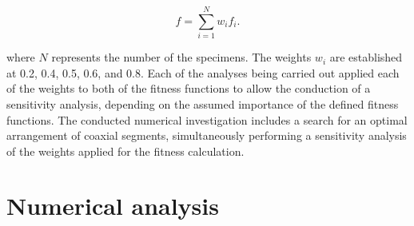 \documentclass[preprint,12pt]{elsarticle}
\begin{document}
\begin{equation}
\label{eq:fitness}
f = \sum_{i = 1}^{N} w_{i}f_{i}.
\end{equation}

\noindent where $N$ represents the number of the specimens. The weights $w_{i}$ are established at 0.2, 0.4, 0.5, 0.6, and 0.8. Each of the analyses being carried out applied each of the weights to both of the fitness functions to allow the conduction of a sensitivity analysis, depending on the assumed importance of the defined fitness functions. The conducted numerical investigation includes a search for an optimal arrangement of coaxial segments, simultaneously performing a sensitivity analysis of the weights applied for the fitness calculation.

\clearpage
\section{Numerical analysis}
\label{sec:num_analysis}
\end{document}
